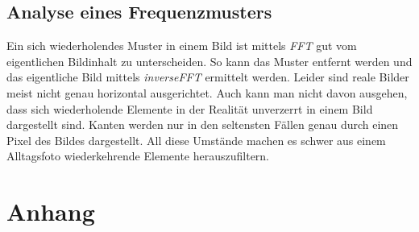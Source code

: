 \documentclass[12pt,german]{article}
\begin{document}
\subsection{Analyse eines Frequenzmusters}
Ein sich wiederholendes Muster in einem Bild ist mittels \textit{FFT} gut vom eigentlichen Bildinhalt zu unterscheiden. So kann das Muster entfernt werden und das eigentliche Bild mittels \textit{inverseFFT} ermittelt werden. Leider sind reale Bilder meist nicht genau horizontal ausgerichtet. Auch kann man nicht davon ausgehen, dass sich wiederholende Elemente in der Realität unverzerrt in einem Bild dargestellt sind. Kanten werden nur in den seltensten Fällen genau durch einen Pixel des Bildes dargestellt. All diese Umstände machen es schwer aus einem Alltagsfoto wiederkehrende Elemente herauszufiltern.

\section{Anhang}

\end{document}
